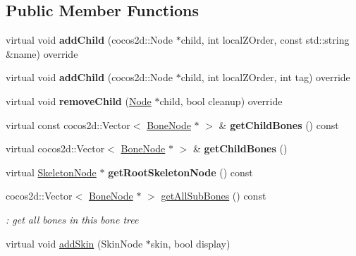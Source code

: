 \subsection*{Public Member Functions}
\begin{DoxyCompactItemize}
\item 
\mbox{\label{classBoneNode_a2ca40225a6a290c8949742299a39ccde}} 
virtual void {\bfseries add\+Child} (cocos2d\+::\+Node $\ast$child, int local\+Z\+Order, const std\+::string \&name) override
\item 
\mbox{\label{classBoneNode_a703f0e5fbbe21672ee6c34e04ac851b4}} 
virtual void {\bfseries add\+Child} (cocos2d\+::\+Node $\ast$child, int local\+Z\+Order, int tag) override
\item 
\mbox{\label{classBoneNode_a46fac15a0c8eb2dccaaca9e298bf2754}} 
virtual void {\bfseries remove\+Child} (\hyperlink{classNode}{Node} $\ast$child, bool cleanup) override
\item 
\mbox{\label{classBoneNode_a0d53e7d33a683180aed73948cd75e47c}} 
virtual const cocos2d\+::\+Vector$<$ \hyperlink{classBoneNode}{Bone\+Node} $\ast$ $>$ \& {\bfseries get\+Child\+Bones} () const
\item 
\mbox{\label{classBoneNode_a4fa4dd0d6b8a20e8c2f0ccbebaf62927}} 
virtual cocos2d\+::\+Vector$<$ \hyperlink{classBoneNode}{Bone\+Node} $\ast$ $>$ \& {\bfseries get\+Child\+Bones} ()
\item 
\mbox{\label{classBoneNode_afcb865d38ffd962924c416f1f7d6d017}} 
virtual \hyperlink{classSkeletonNode}{Skeleton\+Node} $\ast$ {\bfseries get\+Root\+Skeleton\+Node} () const
\item 
\mbox{\label{classBoneNode_a012985939baa44717868d00c7cba108f}} 
cocos2d\+::\+Vector$<$ \hyperlink{classBoneNode}{Bone\+Node} $\ast$ $>$ \hyperlink{classBoneNode_a012985939baa44717868d00c7cba108f}{get\+All\+Sub\+Bones} () const
\begin{DoxyCompactList}\small\item\em \+: get all bones in this bone tree \end{DoxyCompactList}\item 
virtual void \hyperlink{classBoneNode_a82a5e5dcbc6749a7cf9ce54d0f121605}{add\+Skin} (Skin\+Node $\ast$skin, bool display)

\end{DoxyCompactItemize}
